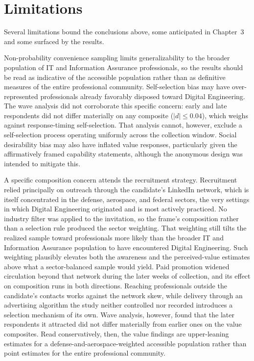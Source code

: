\section{Limitations}

Several limitations bound the conclusions above, some anticipated in Chapter~3 and some surfaced by the results.

Non-probability convenience sampling limits generalizability to the broader population of IT and Information Assurance professionals, so the results should be read as indicative of the accessible population rather than as definitive measures of the entire professional community. Self-selection bias may have over-represented professionals already favorably disposed toward Digital Engineering. The wave analysis did not corroborate this specific concern: early and late respondents did not differ materially on any composite ($|d| \leq 0.04$), which weighs against response-timing self-selection. That analysis cannot, however, exclude a self-selection process operating uniformly across the collection window. Social desirability bias may also have inflated value responses, particularly given the affirmatively framed capability statements, although the anonymous design was intended to mitigate this.

A specific composition concern attends the recruitment strategy. Recruitment relied principally on outreach through the candidate's LinkedIn network, which is itself concentrated in the defense, aerospace, and federal sectors, the very settings in which Digital Engineering originated and is most actively practiced. No industry filter was applied to the invitation, so the frame's composition rather than a selection rule produced the sector weighting. That weighting still tilts the realized sample toward professionals more likely than the broader IT and Information Assurance population to have encountered Digital Engineering. Such weighting plausibly elevates both the awareness and the perceived-value estimates above what a sector-balanced sample would yield. Paid promotion widened circulation beyond that network during the later weeks of collection, and its effect on composition runs in both directions. Reaching professionals outside the candidate's contacts works against the network skew, while delivery through an advertising algorithm the study neither controlled nor recorded introduces a selection mechanism of its own. Wave analysis, however, found that the later respondents it attracted did not differ materially from earlier ones on the value composites. Read conservatively, then, the value findings are upper-leaning estimates for a defense-and-aerospace-weighted accessible population rather than point estimates for the entire professional community.

